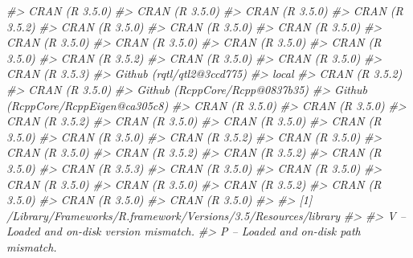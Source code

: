 \documentclass[oneside]{book}\usepackage[]{graphicx}\usepackage[]{color}
\newenvironment{Shaded}{\begin{snugshade}}{\end{snugshade}}
\newcommand{\CommentTok}[1]{\textcolor[rgb]{0.56,0.35,0.01}{\textit{#1}}}
\begin{document}
\begin{Shaded}
\begin{Highlighting}[]
\CommentTok{#>  CRAN (R 3.5.0)                     }
\CommentTok{#>  CRAN (R 3.5.0)                     }
\CommentTok{#>  CRAN (R 3.5.0)                     }
\CommentTok{#>  CRAN (R 3.5.2)                     }
\CommentTok{#>  CRAN (R 3.5.0)                     }
\CommentTok{#>  CRAN (R 3.5.0)                     }
\CommentTok{#>  CRAN (R 3.5.0)                     }
\CommentTok{#>  CRAN (R 3.5.0)                     }
\CommentTok{#>  CRAN (R 3.5.0)                     }
\CommentTok{#>  CRAN (R 3.5.0)                     }
\CommentTok{#>  CRAN (R 3.5.0)                     }
\CommentTok{#>  CRAN (R 3.5.2)                     }
\CommentTok{#>  CRAN (R 3.5.0)                     }
\CommentTok{#>  CRAN (R 3.5.0)                     }
\CommentTok{#>  CRAN (R 3.5.3)                     }
\CommentTok{#>  Github (rqtl/qtl2@3ccd775)         }
\CommentTok{#>  local                              }
\CommentTok{#>  CRAN (R 3.5.2)                     }
\CommentTok{#>  CRAN (R 3.5.0)                     }
\CommentTok{#>  Github (RcppCore/Rcpp@0837b35)     }
\CommentTok{#>  Github (RcppCore/RcppEigen@ca305c8)}
\CommentTok{#>  CRAN (R 3.5.0)                     }
\CommentTok{#>  CRAN (R 3.5.0)                     }
\CommentTok{#>  CRAN (R 3.5.2)                     }
\CommentTok{#>  CRAN (R 3.5.0)                     }
\CommentTok{#>  CRAN (R 3.5.0)                     }
\CommentTok{#>  CRAN (R 3.5.0)                     }
\CommentTok{#>  CRAN (R 3.5.0)                     }
\CommentTok{#>  CRAN (R 3.5.2)                     }
\CommentTok{#>  CRAN (R 3.5.0)                     }
\CommentTok{#>  CRAN (R 3.5.0)                     }
\CommentTok{#>  CRAN (R 3.5.2)                     }
\CommentTok{#>  CRAN (R 3.5.2)                     }
\CommentTok{#>  CRAN (R 3.5.0)                     }
\CommentTok{#>  CRAN (R 3.5.3)                     }
\CommentTok{#>  CRAN (R 3.5.0)                     }
\CommentTok{#>  CRAN (R 3.5.0)                     }
\CommentTok{#>  CRAN (R 3.5.0)                     }
\CommentTok{#>  CRAN (R 3.5.0)                     }
\CommentTok{#>  CRAN (R 3.5.2)                     }
\CommentTok{#>  CRAN (R 3.5.0)                     }
\CommentTok{#>  CRAN (R 3.5.0)                     }
\CommentTok{#>  CRAN (R 3.5.0)                     }
\CommentTok{#> }
\CommentTok{#> [1] /Library/Frameworks/R.framework/Versions/3.5/Resources/library}
\CommentTok{#> }
\CommentTok{#>  V -- Loaded and on-disk version mismatch.}
\CommentTok{#>  P -- Loaded and on-disk path mismatch.}
\end{Highlighting}
\end{Shaded}
\end{document}
